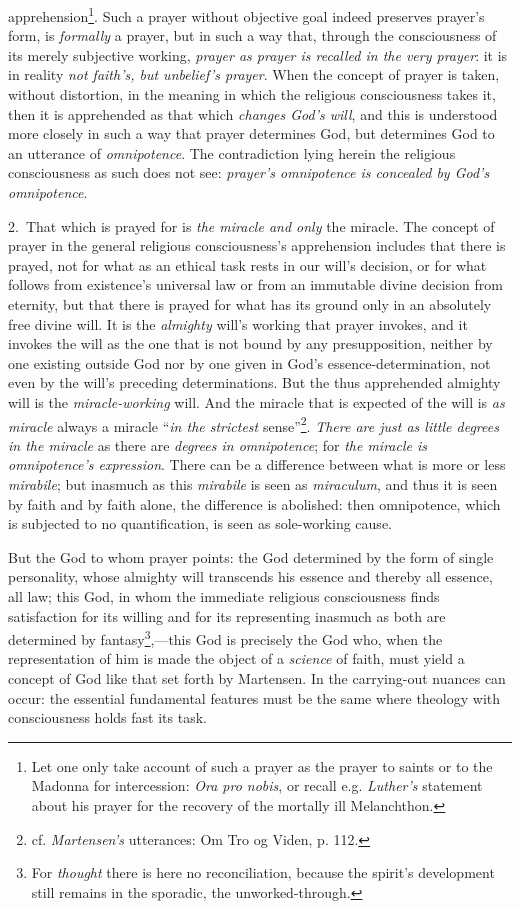 \documentclass[12pt,a4paper]{book}
\begin{document}
apprehension\footnote{Let one only take account of such a prayer as the prayer to saints or to
the Madonna for intercession: \textit{Ora pro nobis}, or recall e.g. \emph{Luther's} statement about
his prayer for the recovery of the mortally ill Melanchthon.}. Such a prayer without objective
goal indeed preserves prayer's form, is \emph{formally} a prayer, but in such a way that, through the
consciousness of its merely subjective working, \emph{prayer as prayer is recalled in the very
prayer}: it is in reality \emph{not faith's, but unbelief's prayer}. When the concept of prayer is
taken, without distortion, in the meaning in which the religious consciousness takes it, then
it is apprehended as that which \emph{changes God's will}, and this is understood more closely
in such a way that prayer determines God, but determines God to an utterance of
\emph{omnipotence}. The contradiction lying herein the religious consciousness as such does not see:
\emph{prayer's omnipotence is concealed by God's omnipotence}.

2.~That which is prayed for is \emph{the miracle and only} the miracle. The concept of prayer
in the general religious consciousness's apprehension includes that there is prayed, not for
what as an ethical task rests in our will's decision, or for what follows from existence's
universal law or from an immutable divine decision from eternity, but that there is prayed for
what has its ground only in an absolutely free divine will. It is the \emph{almighty} will's working
that prayer invokes, and it invokes the will as the one that is not bound by any presupposition,
neither by one existing outside God nor by one given in God's essence-determination, not even
by the will's preceding determinations. But the thus apprehended almighty will is the
\emph{miracle-working} will. And the miracle that is expected of the will is \emph{as miracle} always a
miracle ``\emph{in the strictest} sense''\footnote{cf. \emph{Martensen's} utterances: Om Tro og Viden,
p. 112.}. \emph{There are just as little degrees in the miracle} as there are \emph{degrees in
omnipotence}; for \emph{the miracle is omnipotence's expression}. There can be a difference between
what is more or less \emph{\textit{mirabile}}; but inasmuch as this \textit{mirabile} is seen as
\emph{\textit{miraculum}}, and thus it is seen by faith and by faith alone, the difference is
abolished: then omnipotence, which is subjected to no quantification, is seen as sole-working
cause.

But the God to whom prayer points: the God determined by the form of single personality, whose
almighty will transcends his essence and thereby all essence, all law; this God, in whom the
immediate religious consciousness finds satisfaction for its willing and for its representing
inasmuch as both are determined by fantasy\footnote{For \emph{thought} there is here no reconciliation,
because the spirit's development still remains in the sporadic, the unworked-through.},---this
God is precisely the God who, when the representation of him is made the object of a \emph{science} of
faith, must yield a concept of God like that set forth by Martensen. In the carrying-out
nuances can occur: the essential fundamental features must be the same where theology with
consciousness holds fast its task.
\end{document}

